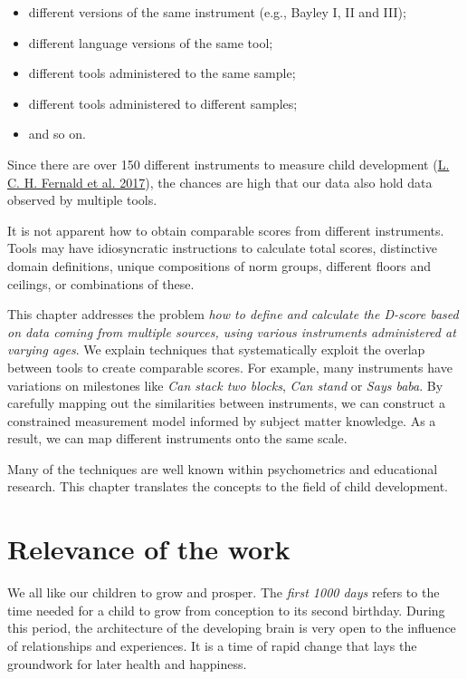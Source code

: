 \documentclass[
]{book}
\providecommand{\tightlist}{%
  \setlength{\itemsep}{0pt}\setlength{\parskip}{0pt}}
\begin{document}
\begin{itemize}
\tightlist
\item
  different versions of the same instrument (e.g., Bayley I, II and III);
\item
  different language versions of the same tool;
\item
  different tools administered to the same sample;
\item
  different tools administered to different samples;
\item
  and so on.
\end{itemize}

Since there are over 150 different instruments to measure child development (\protect\hyperlink{ref-fernald2017toolkit}{L. C. H. Fernald et al. 2017}), the chances are high that our data also hold data observed by multiple tools.

It is not apparent how to obtain comparable scores from different instruments. Tools may have idiosyncratic instructions to calculate total scores, distinctive domain definitions, unique compositions of norm groups, different floors and ceilings, or combinations of these.

This chapter addresses the problem \emph{how to define and calculate the D-score based on data coming from multiple sources, using various instruments administered at varying ages}. We explain techniques that systematically exploit the overlap between tools to create comparable scores. For example, many instruments have variations on milestones like \emph{Can stack two blocks}, \emph{Can stand} or \emph{Says baba}. By carefully mapping out the similarities between instruments, we can construct a constrained measurement model informed by subject matter knowledge. As a result, we can map different instruments onto the same scale.

Many of the techniques are well known within psychometrics and educational research. This chapter translates the concepts to the field of child development.

\hypertarget{sec:relevance}{%
\section{Relevance of the work}\label{sec:relevance}}

We all like our children to grow and prosper. The \emph{first 1000 days} refers to the time needed for a child to grow from conception to its second birthday. During this period, the architecture of the developing brain is very open to the influence of relationships and experiences. It is a time of rapid change that lays the groundwork for later health and happiness.
\end{document}
